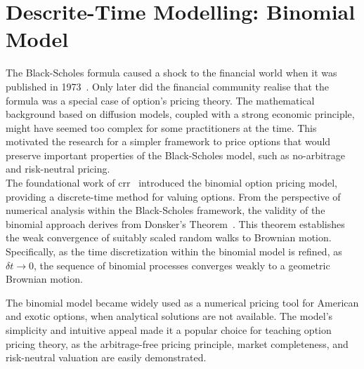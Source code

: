 
\section{Descrite-Time Modelling: Binomial Model}
    \label{sec:desc_time}

    The Black-Scholes formula caused a shock to the financial world when it
    was published in 1973~\cite{black_pricing_1973}. Only later did the
    financial community realise that the formula was a special case of option's pricing theory.
    The mathematical background based on diffusion models, coupled with a strong economic principle,
    might have seemed too complex for some practitioners at the time.
    This motivated the research for a simpler framework to price options that would preserve important
    properties of the Black-Scholes model, such as no-arbitrage and risk-neutral pricing. \\

    The foundational work of \gls{crr}~\cite{cox_option_1979} introduced the binomial option pricing model,
    providing a discrete-time method for valuing options.
    From the perspective of numerical analysis within the Black-Scholes framework,
    the validity of the binomial approach derives from Donsker's Theorem~\cite{billingsley_convergence_1999}.
    This theorem establishes the weak convergence of suitably scaled random walks to Brownian motion.
    Specifically, as the time discretization within the binomial model is refined, as $\delta t \to 0$,
    the sequence of binomial processes converges weakly to a geometric Brownian motion.

    The binomial model became widely used as a numerical pricing tool for American and exotic options,
    when analytical solutions are not available.
    The model's simplicity and intuitive appeal made it a popular choice for teaching option pricing theory,
    as the arbitrage-free pricing principle, market completeness, and risk-neutral valuation are easily demonstrated.

